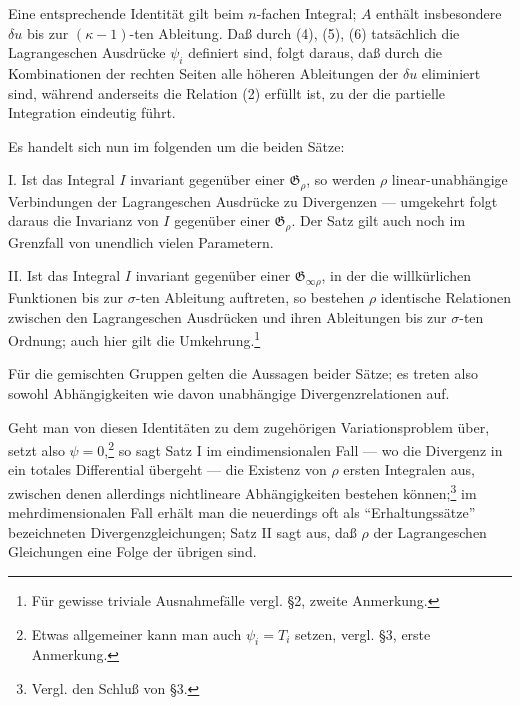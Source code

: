 \documentclass[11pt]{article}
\providecommand{\G}{\mathfrak G}
\begin{document}
Eine entsprechende Identität gilt beim \(n\)-fachen Integral; \(A\) enthält insbesondere \(\delta u\) bis zur \((\kappa-1)\)-ten Ableitung. Daß durch (4), (5), (6) tatsächlich die Lagrangeschen Ausdrücke \(\psi_i\) definiert sind, folgt daraus, daß durch die Kombinationen der rechten Seiten alle höheren Ableitungen der \(\delta u\) eliminiert sind, während anderseits die Relation (2) erfüllt ist, zu der die partielle Integration eindeutig führt.

Es handelt sich nun im folgenden um die beiden Sätze:

I. Ist das Integral \(I\) invariant gegenüber einer \(\G_\rho\), so werden \(\rho\) linear-unabhängige Verbindungen der Lagrangeschen Ausdrücke zu Divergenzen --- umgekehrt folgt daraus die Invarianz von \(I\) gegenüber einer \(\G_\rho\). Der Satz gilt auch noch im Grenzfall von unendlich vielen Parametern.

II. Ist das Integral \(I\) invariant gegenüber einer \(\G_{\infty\rho}\), in der die willkürlichen Funktionen bis zur \(\sigma\)-ten Ableitung auftreten, so bestehen \(\rho\) identische Relationen zwischen den Lagrangeschen Ausdrücken und ihren Ableitungen bis zur \(\sigma\)-ten Ordnung; auch hier gilt die Umkehrung.\footnote{Für gewisse triviale Ausnahmefälle vergl. \S{}2, zweite Anmerkung.}

Für die gemischten Gruppen gelten die Aussagen beider Sätze; es treten also sowohl Abhängigkeiten wie davon unabhängige Divergenzrelationen auf.

Geht man von diesen Identitäten zu dem zugehörigen Variationsproblem über, setzt also \(\psi=0\),\footnote{Etwas allgemeiner kann man auch \(\psi_i=T_i\) setzen, vergl. \S{}3, erste Anmerkung.} so sagt Satz I im eindimensionalen Fall --- wo die Divergenz in ein totales Differential übergeht --- die Existenz von \(\rho\) ersten Integralen aus, zwischen denen allerdings nichtlineare Abhängigkeiten bestehen können;\footnote{Vergl. den Schluß von \S{}3.} im mehrdimensionalen Fall erhält man die neuerdings oft als ``Erhaltungssätze'' bezeichneten Divergenzgleichungen; Satz II sagt aus, daß \(\rho\) der Lagrangeschen Gleichungen eine Folge der übrigen sind.
\end{document}
